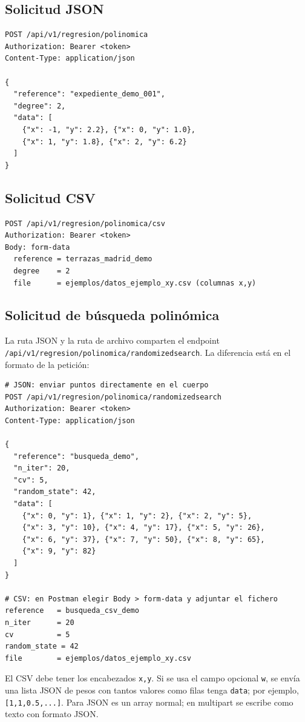 \documentclass[11pt,a4paper]{article}
\begin{document}
\subsection{Solicitud JSON}
\begin{lstlisting}
POST /api/v1/regresion/polinomica
Authorization: Bearer <token>
Content-Type: application/json

{
  "reference": "expediente_demo_001",
  "degree": 2,
  "data": [
    {"x": -1, "y": 2.2}, {"x": 0, "y": 1.0},
    {"x": 1, "y": 1.8}, {"x": 2, "y": 6.2}
  ]
}
\end{lstlisting}

\subsection{Solicitud CSV}
\begin{lstlisting}
POST /api/v1/regresion/polinomica/csv
Authorization: Bearer <token>
Body: form-data
  reference = terrazas_madrid_demo
  degree    = 2
  file      = ejemplos/datos_ejemplo_xy.csv (columnas x,y)
\end{lstlisting}

\subsection{Solicitud de búsqueda polinómica}
La ruta JSON y la ruta de archivo comparten el endpoint \texttt{/api/v1/regresion/polinomica/randomizedsearch}. La diferencia está en el formato de la petición:
\begin{lstlisting}
# JSON: enviar puntos directamente en el cuerpo
POST /api/v1/regresion/polinomica/randomizedsearch
Authorization: Bearer <token>
Content-Type: application/json

{
  "reference": "busqueda_demo",
  "n_iter": 20,
  "cv": 5,
  "random_state": 42,
  "data": [
    {"x": 0, "y": 1}, {"x": 1, "y": 2}, {"x": 2, "y": 5},
    {"x": 3, "y": 10}, {"x": 4, "y": 17}, {"x": 5, "y": 26},
    {"x": 6, "y": 37}, {"x": 7, "y": 50}, {"x": 8, "y": 65},
    {"x": 9, "y": 82}
  ]
}

# CSV: en Postman elegir Body > form-data y adjuntar el fichero
reference   = busqueda_csv_demo
n_iter      = 20
cv          = 5
random_state = 42
file        = ejemplos/datos_ejemplo_xy.csv
\end{lstlisting}
El CSV debe tener los encabezados \texttt{x,y}. Si se usa el campo opcional \texttt{w}, se envía una lista JSON de pesos con tantos valores como filas tenga \texttt{data}; por ejemplo, \texttt{[1,1,0.5,...]}. Para JSON es un array normal; en multipart se escribe como texto con formato JSON.
\end{document}
